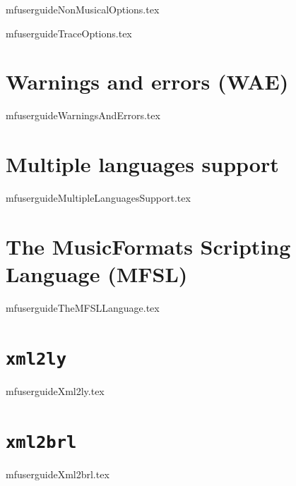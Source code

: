 \documentclass[11pt,a4paper]{report}
\begin{document}
{mfuserguideNonMusicalOptions.tex}

{mfuserguideTraceOptions.tex}



\part{Warnings and errors (WAE)}

{mfuserguideWarningsAndErrors.tex}


\part{Multiple languages support}

{mfuserguideMultipleLanguagesSupport.tex}


\part{The MusicFormats Scripting Language (MFSL)}

{mfuserguideTheMFSLLanguage.tex}


\part{{\tt xml2ly}}

{mfuserguideXml2ly.tex}


\part{{\tt xml2brl}}

{mfuserguideXml2brl.tex}
\end{document}
